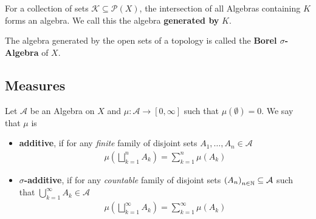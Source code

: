 For a collection of sets $\mathcal{K} \subseteq \mathcal{P}(X)$, the intersection of all Algebras containing $K$ forms an algebra.
We call this the algebra \textbf{generated by} $K$.

The algebra generated by the open sets of a topology is called the \textbf{Borel $\sigma$-Algebra} of $X$.


\subsection{Measures}
\begin{dfn}[]
  Let $\mathcal{A}$ be an Algebra on $X$ and $\mu: \mathcal{A} \to [0,\infty]$ such that $\mu(\emptyset) = 0$. We say that $\mu$ is
  \begin{itemize}
    \item \textbf{additive}, if for any \emph{finite} family of disjoint sets $A_{1}, \ldots, A_{n} \in \mathcal{A}$
      \begin{align*}
        \mu \left(
          \bigsqcup_{k=1}^{n}A_k
        \right)
        =
        \sum_{k=1}^{n}\mu(A_k)
      \end{align*}
    \item \textbf{$\sigma$-additive}, if for any \emph{countable} family of
      disjoint sets $\left(A_{n}\right)_{n \in \mathbb{N}} \subseteq \mathcal{A}$ such that $\bigcup_{k=1}^{\infty}A_k \in \mathcal{A}$
      \begin{align*}
        \mu \left(
          \bigsqcup_{k=1}^{\infty}A_k
        \right)
        =
        \sum_{k=1}^{\infty}\mu(A_k)
      \end{align*}
  \end{itemize}
\end{dfn}

